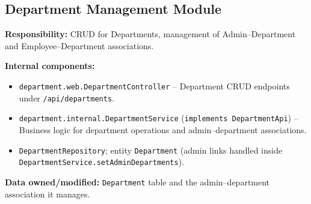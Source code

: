 \documentclass[11pt,a4paper]{article}
\begin{document}
\subsection{Department Management Module}

\textbf{Responsibility:} CRUD for Departments, management of Admin--Department and Employee--Department associations.

\textbf{Internal components:}
\begin{itemize}[leftmargin=1.5em]
    \item \texttt{department.web.DepartmentController} -- Department CRUD endpoints under \texttt{/api/departments}.
    \item \texttt{department.internal.DepartmentService} (\texttt{implements DepartmentApi}) -- Business logic for department operations and admin--department associations.
    \item \texttt{DepartmentRepository}; entity \texttt{Department} (admin links handled inside \texttt{DepartmentService.\allowbreak setAdminDepartments}).
\end{itemize}

\textbf{Data owned/modified:} \texttt{Department} table and the admin--department association it manages.
\end{document}

